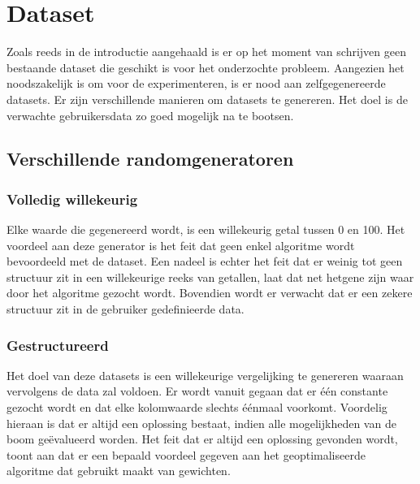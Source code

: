\documentclass[Main.tex]{subfiles}
\begin{document}
\section{Dataset}

Zoals reeds in de introductie aangehaald is er op het moment van schrijven geen bestaande dataset die geschikt is voor het onderzochte probleem. Aangezien het noodszakelijk is om voor de experimenteren, is er nood aan zelfgegenereerde datasets. Er zijn verschillende manieren om datasets te genereren. Het doel is de verwachte gebruikersdata zo goed mogelijk na te bootsen.
  
\subsection{Verschillende randomgeneratoren}
\subsubsection*{Volledig willekeurig}
Elke waarde die gegenereerd wordt, is een willekeurig getal tussen 0 en 100. Het voordeel aan deze generator is het feit dat geen enkel algoritme wordt bevoordeeld met de dataset. Een nadeel is echter het feit dat er weinig tot geen structuur zit in een willekeurige reeks van getallen, laat dat net hetgene zijn waar door het algoritme gezocht wordt. Bovendien wordt er verwacht dat er een zekere structuur zit in de gebruiker gedefinieerde data.

\subsubsection*{Gestructureerd}
Het doel van deze datasets is een willekeurige vergelijking te genereren waaraan vervolgens de data zal voldoen. Er wordt vanuit gegaan dat er \'e\'en constante gezocht wordt en dat elke kolomwaarde slechts \'e\'enmaal voorkomt. Voordelig hieraan is dat er altijd een oplossing bestaat, indien alle mogelijkheden van de boom ge\"evalueerd worden. Het feit dat er altijd een oplossing gevonden wordt, toont aan dat er een bepaald voordeel gegeven aan het geoptimaliseerde algoritme dat gebruikt maakt van gewichten.
\end{document}
